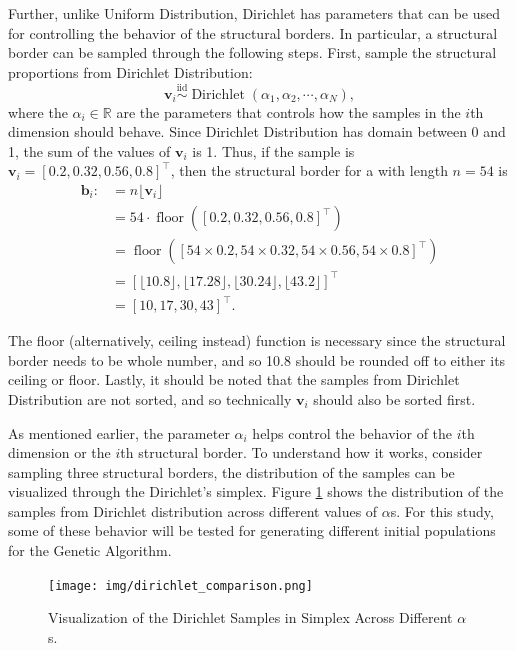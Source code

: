 Further, unlike Uniform Distribution, Dirichlet has parameters that can be used for controlling the behavior of the structural borders. In particular, a structural border can be sampled through the following steps. First, sample the structural proportions from Dirichlet Distribution:
\begin{equation}
    \mathbf{v}_i\overset{\text{iid}}{\sim}\operatorname{Dirichlet}(\alpha_1,\alpha_2,\cdots,\alpha_N),
\end{equation}
where the $\alpha_i\in\mathbb{R}$ are the parameters that controls how the samples in the $i$th dimension should behave. Since Dirichlet Distribution has domain between 0 and 1, the sum of the values of $\mathbf{v}_i$ is 1. Thus, if the sample is $\mathbf{v}_i=[0.2, 0.32, 0.56, 0.8]^{\top}$, then the structural border for a   with length $n=54$ is
\begin{align}
    \mathbf{b}_{i}:&=n\lfloor\mathbf{v}_i\rfloor\\
    &=54\cdot\operatorname{floor}([0.2, 0.32, 0.56, 0.8]^{\top})\\
    &=\operatorname{floor}([54\times 0.2, 54\times 0.32, 54\times 0.56, 54\times 0.8]^{\top})\\
    &=[\lfloor 10.8\rfloor, \lfloor 17.28\rfloor , \lfloor 30.24\rfloor , \lfloor 43.2\rfloor ]^{\top}\\
    &=[10, 17, 30, 43]^{\top}.
\end{align}

The floor (alternatively, ceiling instead) function is necessary since the structural border needs to be whole number, and so 10.8 should be rounded off to either its ceiling or floor. Lastly, it should be noted that the samples from Dirichlet Distribution are not sorted, and so technically $\mathbf{v}_i$ should also be sorted first. 

As mentioned earlier, the parameter $\alpha_i$ helps control the behavior of the $i$th dimension or the $i$th structural border. To understand how it works, consider sampling three structural borders, the distribution of the samples can be visualized through the Dirichlet's simplex. Figure \ref{fig:result_dirichlet_simplex} shows the distribution of the samples from Dirichlet distribution across different values of $\alpha$s. For this study, some of these behavior will be tested for generating different initial populations for the Genetic Algorithm.

\begin{figure}[!t]
    \centering
    \texttt{[image: img/dirichlet\_comparison.png]}
    \caption{Visualization of the Dirichlet Samples in Simplex Across Different $\alpha$s.}
    \label{fig:result_dirichlet_simplex}
\end{figure}
